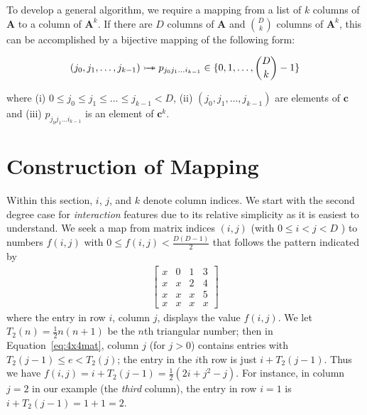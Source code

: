\documentclass{article}
\begin{document}
To develop a general algorithm, we require a mapping from a list of $k$ columns of $\bm{A}$ to a column of $\bm{A}^k$.
If there are $D$ columns of $\bm{A}$ and $\binom{D}{k}$ columns of $\bm{A}^k$, this can be accomplished by a bijective mapping of the following form:

\begin{equation}
(j_0, j_1, \dots, j_{k-1}) \rightarrowtail \hspace{-1.9ex} \twoheadrightarrow p_{j_0j_1 \dots i_{k-1}} \in \{0,1,\dots,\binom{D}{k}-1\} 
\end{equation}

where (i) $ 0 \le j_0 \le j_1 \le \dots \le j_{k-1} < D$, (ii) $(j_0, j_1, \dots, j_{k-1})$ are elements of $\bm{c}$ and (iii) $p_{j_0j_1 \dots i_{k-1}}$ is an element of $\bm{c}^k$. %

\section{Construction of Mapping}

Within this section, $i$, $j$, and $k$ denote column indices.
We start with the second degree case for \emph{interaction} features due to its relative simplicity as it is easiest to understand. We seek a map from matrix indices $(i, j)$ (with $0 \le i < j < D$ ) to numbers $f(i, j)$ with $0 \le f(i, j) < \frac{D(D-1)}{2}$ that follows the pattern indicated by 
\begin{align}
\begin{bmatrix}
x & 0 & 1 & 3 \\
x & x & 2 & 4 \\
x & x & x & 5 \\
x & x & x & x
\end{bmatrix}
\label{eq:4x4mat}
\end{align}
where the entry in row $i$, column $j$, displays the value $f(i, j)$. We let $T_2(n) = \frac{1}{2} n(n+1)$ 
be the $n$th triangular number; then in Equation~\ref{eq:4x4mat}, column $j$ (for $j > 0$) contains entries with  
$T_2(j-1) \le e < T_2(j)$; the entry in the $i$th row is just $i + T_2(j-1)$. Thus we have
$
f(i, j) 
= i + T_2(j-1) =  \frac{1}{2}(2i + j^2-j).$
For instance, in column $j = 2$ in our example (the \emph{third} column), the entry in row $i = 1$ is 
$i + T_2(j-1) = 1 + 1 = 2$. 
\end{document}
